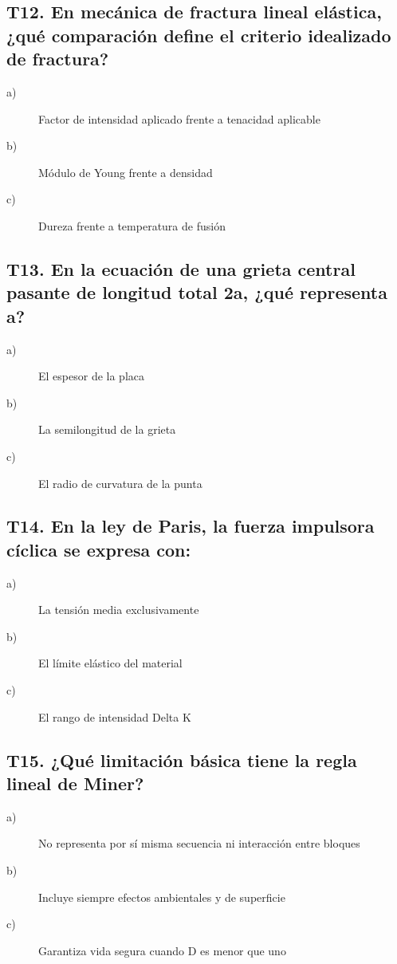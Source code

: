 \subsection*{T12. En mecánica de fractura lineal elástica, ¿qué comparación define el criterio idealizado de fractura?}
\begin{description}
\item[a)] Factor de intensidad aplicado frente a tenacidad aplicable
\item[b)] Módulo de Young frente a densidad
\item[c)] Dureza frente a temperatura de fusión
\end{description}

\subsection*{T13. En la ecuación de una grieta central pasante de longitud total 2a, ¿qué representa a?}
\begin{description}
\item[a)] El espesor de la placa
\item[b)] La semilongitud de la grieta
\item[c)] El radio de curvatura de la punta
\end{description}

\subsection*{T14. En la ley de Paris, la fuerza impulsora cíclica se expresa con:}
\begin{description}
\item[a)] La tensión media exclusivamente
\item[b)] El límite elástico del material
\item[c)] El rango de intensidad Delta K
\end{description}

\subsection*{T15. ¿Qué limitación básica tiene la regla lineal de Miner?}
\begin{description}
\item[a)] No representa por sí misma secuencia ni interacción entre bloques
\item[b)] Incluye siempre efectos ambientales y de superficie
\item[c)] Garantiza vida segura cuando D es menor que uno
\end{description}

